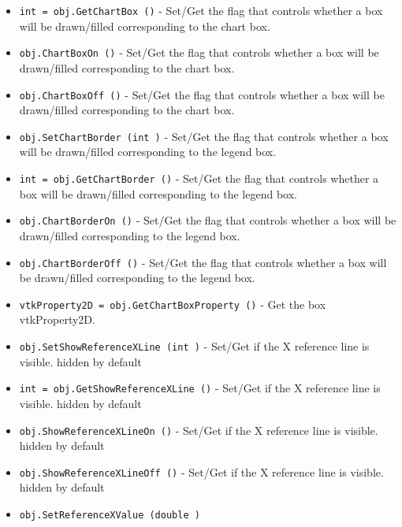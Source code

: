 \begin{itemize}
\item  \verb|int = obj.GetChartBox ()| -  Set/Get the flag that controls whether a box will be drawn/filled
 corresponding to the chart box.

\item  \verb|obj.ChartBoxOn ()| -  Set/Get the flag that controls whether a box will be drawn/filled
 corresponding to the chart box.

\item  \verb|obj.ChartBoxOff ()| -  Set/Get the flag that controls whether a box will be drawn/filled
 corresponding to the chart box.

\item  \verb|obj.SetChartBorder (int )| -  Set/Get the flag that controls whether a box will be drawn/filled
 corresponding to the legend box.

\item  \verb|int = obj.GetChartBorder ()| -  Set/Get the flag that controls whether a box will be drawn/filled
 corresponding to the legend box.

\item  \verb|obj.ChartBorderOn ()| -  Set/Get the flag that controls whether a box will be drawn/filled
 corresponding to the legend box.

\item  \verb|obj.ChartBorderOff ()| -  Set/Get the flag that controls whether a box will be drawn/filled
 corresponding to the legend box.

\item  \verb|vtkProperty2D = obj.GetChartBoxProperty ()| -  Get the box vtkProperty2D.

\item  \verb|obj.SetShowReferenceXLine (int )| -  Set/Get if the X reference line is visible. hidden by default

\item  \verb|int = obj.GetShowReferenceXLine ()| -  Set/Get if the X reference line is visible. hidden by default

\item  \verb|obj.ShowReferenceXLineOn ()| -  Set/Get if the X reference line is visible. hidden by default

\item  \verb|obj.ShowReferenceXLineOff ()| -  Set/Get if the X reference line is visible. hidden by default

\item  \verb|obj.SetReferenceXValue (double )|


\end{itemize}
